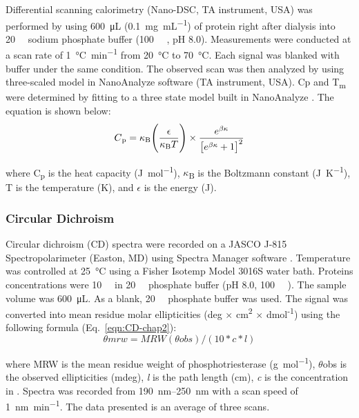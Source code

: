 \begin{refsection}
Differential scanning calorimetry (Nano-DSC, TA instrument, USA) was performed
by using \SI{600}{\micro\L} (\SI{0.1}{\mg\per\mL}) of protein right after
dialysis into \SI{20}{\milli\Molar} sodium phosphate buffer
(\SI{100}{\micro\Molar} , pH 8.0).  Measurements were conducted at a
scan rate of \SI{1}{\celsius\per\minute} from \SI{20}{\celsius} to
\SI{70}{\celsius}. Each signal was blanked with buffer under the same condition.
The observed scan was then analyzed by using three-scaled model in NanoAnalyze
software (TA instrument, USA). Cp and T\textsubscript{m} were determined by
fitting to a three state model built in NanoAnalyze \cite{Privalov1986}. The
equation is shown below:
\begin{equation} C\textsubscript{p} = \kappa\textsubscript{B}
    \Bigg(\frac{\epsilon}{\kappa\textsubscript{B}T}\Bigg) \times
    \frac{e^{\beta\kappa}}{\big[e^{\beta\kappa}+1\big]^{2}}
    \label{eqn:dsc-chap2} \end{equation}

where C\textsubscript{p} is the heat capacity (\si{\J\per\mol}),
$\kappa$\textsubscript{B} is the Boltzmann constant (\si{\J\per\kelvin}), T is
the temperature (\si{\kelvin}), and $\epsilon$ is the energy (\si{J}).

\subsubsection{Circular Dichroism}

Circular dichroism (CD) spectra were recorded on a JASCO J-815
Spectropolarimeter (Easton, MD) using Spectra Manager software
\cite{Kataev1985}. Temperature was controlled at \SI{25}{\celsius} using a
Fisher Isotemp Model 3016S water bath.  Proteins concentrations were
\SI{10}{\micro\Molar} in \SI{20}{\milli\Molar} phosphate buffer (pH 8.0,
\SI{100}{\micro\Molar} ). The sample volume was
\SI{600}{\micro\liter}. As a blank, \SI{20}{\milli\Molar} phosphate buffer was
used. The signal was converted into mean residue molar ellipticities (deg
$\times$ cm\textsuperscript{2} $\times$ dmol\textsuperscript{-1}) using the
following formula \cite{Kelly2005} (Eq.~\ref{eqn:CD-chap2}): 
\begin{equation} θmrw = MRW(θobs) / (10 * c * l) \label{eqn:CD-chap2}
\end{equation}

where MRW is the mean residue weight of phosphotriesterase
(\si{\gram\per\mol}), $\theta$obs is the observed ellipticities (mdeg),
\emph{l} is the path length (cm), \emph{c} is the concentration in
\SI{}{\Molar}. Spectra was recorded from \SIrange{190}{250}{\nm} with a scan
speed of \SI{1}{\nano\meter\per\minute}.  The data presented is an average of
three scans.


\end{refsection}
